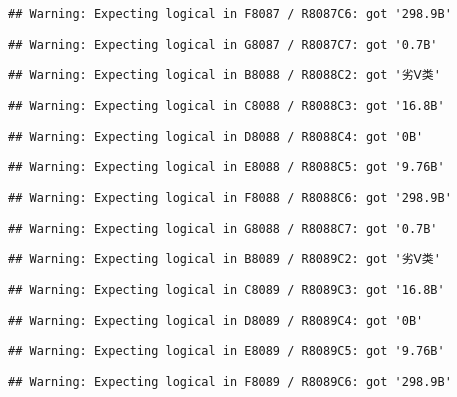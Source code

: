 \documentclass[
]{article}
\begin{document}
\begin{verbatim}
## Warning: Expecting logical in F8087 / R8087C6: got '298.9B'
\end{verbatim}

\begin{verbatim}
## Warning: Expecting logical in G8087 / R8087C7: got '0.7B'
\end{verbatim}

\begin{verbatim}
## Warning: Expecting logical in B8088 / R8088C2: got '劣Ⅴ类'
\end{verbatim}

\begin{verbatim}
## Warning: Expecting logical in C8088 / R8088C3: got '16.8B'
\end{verbatim}

\begin{verbatim}
## Warning: Expecting logical in D8088 / R8088C4: got '0B'
\end{verbatim}

\begin{verbatim}
## Warning: Expecting logical in E8088 / R8088C5: got '9.76B'
\end{verbatim}

\begin{verbatim}
## Warning: Expecting logical in F8088 / R8088C6: got '298.9B'
\end{verbatim}

\begin{verbatim}
## Warning: Expecting logical in G8088 / R8088C7: got '0.7B'
\end{verbatim}

\begin{verbatim}
## Warning: Expecting logical in B8089 / R8089C2: got '劣Ⅴ类'
\end{verbatim}

\begin{verbatim}
## Warning: Expecting logical in C8089 / R8089C3: got '16.8B'
\end{verbatim}

\begin{verbatim}
## Warning: Expecting logical in D8089 / R8089C4: got '0B'
\end{verbatim}

\begin{verbatim}
## Warning: Expecting logical in E8089 / R8089C5: got '9.76B'
\end{verbatim}

\begin{verbatim}
## Warning: Expecting logical in F8089 / R8089C6: got '298.9B'
\end{verbatim}
\end{document}
